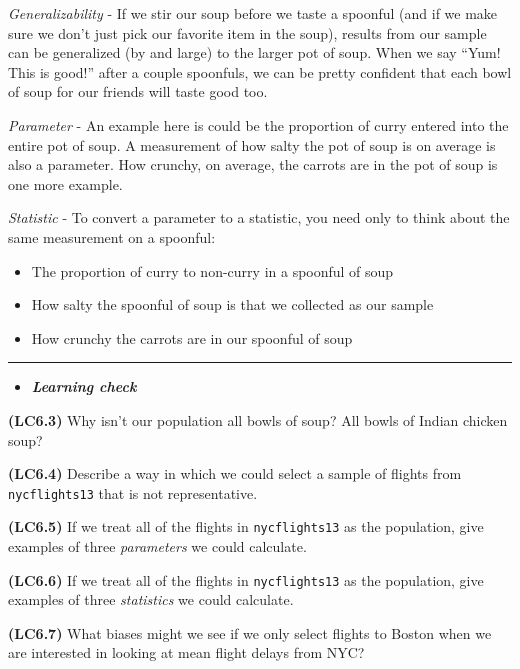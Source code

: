 \documentclass[]{tufte-book}
\let\oldrule=\rule
\renewcommand{\rule}[1]{\oldrule{\linewidth}}
\providecommand{\tightlist}{%
  \setlength{\itemsep}{0pt}\setlength{\parskip}{0pt}}
\newenvironment{rmdblock}[1]
  {\begin{shaded*}
  \begin{itemize}
  \renewcommand{\labelitemi}{
    \raisebox{-.7\height}[0pt][0pt]{
    }
  }
  \item
  }
  {
  \end{itemize}
  \end{shaded*}
  }
\newenvironment{learncheck}
  {\begin{rmdblock}{warning}}
  {\end{rmdblock}}
\theoremstyle{definition}
\theoremstyle{definition}
\theoremstyle{remark}
\begin{document}
\emph{Generalizability} - If we stir our soup before we taste a spoonful
(and if we make sure we don't just pick our favorite item in the soup),
results from our sample can be generalized (by and large) to the larger
pot of soup. When we say ``Yum! This is good!'' after a couple
spoonfuls, we can be pretty confident that each bowl of soup for our
friends will taste good too.

\emph{Parameter} - An example here is could be the proportion of curry
entered into the entire pot of soup. A measurement of how salty the pot
of soup is on average is also a parameter. How crunchy, on average, the
carrots are in the pot of soup is one more example.

\emph{Statistic} - To convert a parameter to a statistic, you need only
to think about the same measurement on a spoonful:

\begin{itemize}
\tightlist
\item
  The proportion of curry to non-curry in a spoonful of soup
\item
  How salty the spoonful of soup is that we collected as our sample
\item
  How crunchy the carrots are in our spoonful of soup
\end{itemize}

\begin{center}\rule{0.5\linewidth}{\linethickness}\end{center}

\begin{learncheck}
\textbf{\emph{Learning check}}
\end{learncheck}

\textbf{(LC6.3)} Why isn't our population all bowls of soup? All bowls
of Indian chicken soup?

\textbf{(LC6.4)} Describe a way in which we could select a sample of
flights from \texttt{nycflights13} that is not representative.

\textbf{(LC6.5)} If we treat all of the flights in \texttt{nycflights13}
as the population, give examples of three \emph{parameters} we could
calculate.

\textbf{(LC6.6)} If we treat all of the flights in \texttt{nycflights13}
as the population, give examples of three \emph{statistics} we could
calculate.

\textbf{(LC6.7)} What biases might we see if we only select flights to
Boston when we are interested in looking at mean flight delays from NYC?
\end{document}
